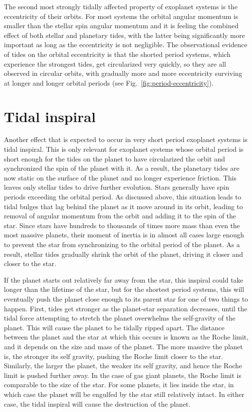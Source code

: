 The second most strongly tidally affected property of exoplanet systems is the
eccentricity of their orbits. For most systems the orbital angular momentum is
smaller than the stellar spin angular momentum and it is feeling the combined
effect of both stellar and planetary tides, with the latter being significantly
more important as long as the eccentricity is not negligible. The observational
evidence of tides on the orbital eccentricity is that the shorted period
systems, which experience the strongest tides, get circularized very quickly, so
they are all observed in circular orbits, with gradually more and more
eccentricity surviving at longer and longer orbital periods (see
Fig.~\ref{fig:period-eccentricity}).

\section{Tidal inspiral}

Another effect that is expected to occur in very short period exoplanet systems
is tidal inspiral. This is only relevant for exoplanet systems whose orbital
period is short enough for the tides on the planet to have circularized the
orbit and synchronized the spin of the planet with it. As a result, the
planetary tides are now static on the surface of the planet and no longer
experience friction. This leaves only stellar tides to drive further evolution.
Stars generally have spin periods exceeding the orbital period. As discussed
above, this situation leads to tidal bulges that lag behind the planet as it
move around in its orbit, leading to removal of angular momentum from the orbit
and adding it to the spin of the star. Since stars have hundreds to thousands of
times more mass than even the most massive planets, their moment of inertia is
in almost all cases large enough to prevent the star from synchronizing to the
orbital period of the planet. As a result, stellar tides gradually shrink the
orbit of the planet, driving it closer and closer to the star.

If the planet starts out relatively far away from the star, this inspiral could
take longer than the lifetime of the star, but for the shortest period systems,
this will eventually push the planet close enough to its parent star for one of
two things to happen. First, tides get stronger as the planet-star separation
decreases, until the tidal force attempting to stretch the planet overwhelms the
self-gravity of the planet. This will cause the planet to be tidally ripped
apart. The distance between the planet and the star at which this occurs is
known as the Roche limit, and it depends on the size and mass of the planet. The
more massive the planet is, the stronger its self gravity, pushing the Roche
limit closer to the star.  Similarly, the larger the planet, the weaker its self
gravity, and hence the Roche limit is pushed further away. In the case of gas
giant planets, the Roche limit is comparable to the size of the star. For some
planets, it lies inside the star, in which case the planet will be engulfed by
the star still relatively intact. In either case, the tidal inspiral will cause
the destruction of the planet.

